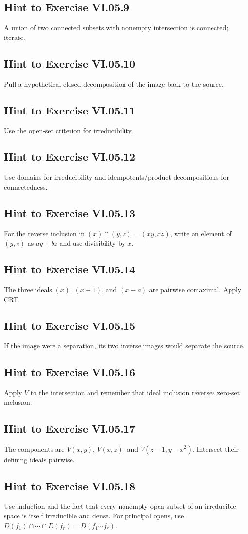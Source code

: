 \subsection*{Hint to Exercise VI.05.9}
A union of two connected subsets with nonempty intersection is connected; iterate.

\subsection*{Hint to Exercise VI.05.10}
Pull a hypothetical closed decomposition of the image back to the source.

\subsection*{Hint to Exercise VI.05.11}
Use the open-set criterion for irreducibility.

\subsection*{Hint to Exercise VI.05.12}
Use domains for irreducibility and idempotents/product decompositions for connectedness.

\subsection*{Hint to Exercise VI.05.13}
For the reverse inclusion in \((x)\cap(y,z)=(xy,xz)\), write an element of \((y,z)\) as
\(ay+bz\) and use divisibility by \(x\).

\subsection*{Hint to Exercise VI.05.14}
The three ideals \((x)\), \((x-1)\), and \((x-a)\) are pairwise comaximal.  Apply CRT.

\subsection*{Hint to Exercise VI.05.15}
If the image were a separation, its two inverse images would separate the source.

\subsection*{Hint to Exercise VI.05.16}
Apply \(V\) to the intersection and remember that ideal inclusion reverses zero-set
inclusion.

\subsection*{Hint to Exercise VI.05.17}
The components are \(V(x,y)\), \(V(x,z)\), and \(V(z-1,y-x^2)\).  Intersect their defining
ideals pairwise.

\subsection*{Hint to Exercise VI.05.18}
Use induction and the fact that every nonempty open subset of an irreducible space is itself
irreducible and dense.  For principal opens, use \(D(f_1)\cap\cdots\cap D(f_r)=D(f_1\cdots f_r)\).
